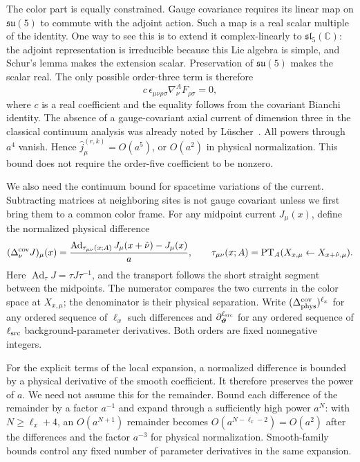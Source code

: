 \documentclass[11pt,a4paper]{article}
\theoremstyle{remark}
\DeclareMathOperator{\Ad}{Ad}
\begin{document}
The color part is equally constrained. Gauge covariance requires its
linear map on $\mathfrak{su}(5)$ to commute with the adjoint action.
Such a map is a real scalar multiple of the identity. One way to see
this is to extend it complex-linearly to $\mathfrak{sl}_5(\mathbb C)$:
the adjoint representation is irreducible because this Lie algebra is
simple, and Schur's lemma makes the extension scalar. Preservation of
$\mathfrak{su}(5)$ makes the scalar real. The only possible
order-three term is therefore
\begin{equation}
 c\,\epsilon_{\mu\nu\rho\sigma}\nabla_\nu^A F_{\rho\sigma}=0,
\end{equation}
where $c$ is a real coefficient and the equality follows from the
covariant Bianchi identity. The absence of a gauge-covariant axial current of dimension three in the classical continuum analysis was already noted by L\"uscher~\cite[sec.~8]{LuscherNonabelian}. All powers through $a^4$ vanish. Hence
$\widehat j_\mu^{(r,k)}=O(a^5)$, or $O(a^2)$ in physical
normalization. This bound does not require the order-five coefficient
to be nonzero.

We also need the continuum bound for spacetime variations of the
current. Subtracting matrices at neighboring sites is not gauge
covariant unless we first bring them to a common color frame. For any
midpoint current $J_\mu(x)$, define the normalized physical difference
\begin{equation}
 (\Delta_\nu^{\rm cov}J)_\mu(x)
  =\frac{\Ad_{\tau_{\mu\nu}(x;A)}
                     J_\mu(x+\hat\nu)-J_\mu(x)}{a},
 \qquad
 \tau_{\mu\nu}(x;A)
   =\operatorname{PT}_A(X_{x,\mu}\leftarrow X_{x+\hat\nu,\mu}).
\end{equation}
Here $\Ad_\tau J=\tau J\tau^{-1}$, and the transport follows the
short straight segment between the midpoints. The numerator compares
the two currents in the color space at $X_{x,\mu}$; the denominator
is their physical separation. Write
$(\Delta_{\rm phys}^{\rm cov})^{\ell_x}$ for any ordered sequence
of $\ell_x$ such differences and
$\partial_{\boldsymbol\vartheta}^{\ell_{\rm src}}$ for any ordered
sequence of $\ell_{\rm src}$ background-parameter derivatives.
Both orders are fixed nonnegative integers.

For the explicit terms of the local expansion, a normalized difference
is bounded by a physical derivative of the smooth coefficient. It
therefore preserves the power of $a$. We need not assume this for the
remainder. Bound each difference of the remainder by a factor $a^{-1}$
and expand through a sufficiently high power $a^N$: with
$N\ge\ell_x+4$, an $O(a^{N+1})$ remainder becomes
$O(a^{N-\ell_x-2})=O(a^2)$ after the differences and the factor
$a^{-3}$ for physical normalization. Smooth-family bounds control
any fixed number of parameter derivatives in the same expansion.
\end{document}
